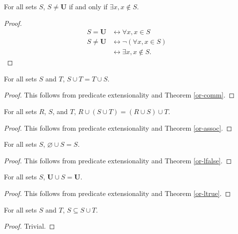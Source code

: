\documentclass[../math.tex]{subfiles}
\begin{document}
\begin{theorem} \label{all-neq}
    For all sets $S$, $S \neq \bm U$ if and only if $\exists x, x \notin S$.
\end{theorem}
\begin{proof}
    \begin{align*}
        S = \bm U &\leftrightarrow \forall x, x \in S \\
        S \neq \bm U &\leftrightarrow \neg(\forall x, x \in S) \\
                 &\leftrightarrow \exists x, x \notin S.
    \end{align*}
\end{proof}

\begin{theorem} \label{union-comm}
    For all sets $S$ and $T$, $S \cup T = T \cup S$.
\end{theorem}
\begin{proof}
    This follows from predicate extensionality and Theorem \ref{or-comm}.
\end{proof}

\begin{theorem} \label{union-assoc}
    For all sets $R$, $S$, and $T$, $R \cup (S \cup T) = (R \cup S) \cup T$.
\end{theorem}
\begin{proof}
    This follows from predicate extensionality and Theorem \ref{or-assoc}.
\end{proof}

\begin{theorem} \label{union-lid}
    For all sets $S$, $\varnothing \cup S = S$.
\end{theorem}
\begin{proof}
    This follows from predicate extensionality and Theorem \ref{or-lfalse}.
\end{proof}

\begin{theorem} \label{union-lanni}
    For all sets $S$, $\bm U \cup S = \bm U$.
\end{theorem}
\begin{proof}
    This follows from predicate extensionality and Theorem \ref{or-ltrue}.
\end{proof}

\begin{theorem} \label{union-lsub}
    For all sets $S$ and $T$, $S \subseteq S \cup T$.
\end{theorem}
\begin{proof}
    Trivial.
\end{proof}
\end{document}

